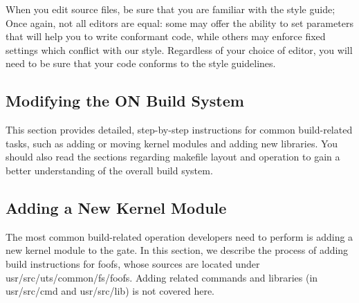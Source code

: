 \documentclass{article}
\begin{document}
When you edit source files, be sure that you are familiar with the style guide;
Once again, not all editors are equal: some may offer the ability to set
parameters that will help you to write conformant code, while others may enforce
fixed settings which conflict with our style. Regardless of your choice of
editor, you will need to be sure that your code conforms to the style
guidelines.

\subsection*{Modifying the ON Build System}

This section provides detailed, step-by-step instructions for common
build-related tasks, such as adding or moving kernel modules and adding new
libraries. You should also read the sections regarding makefile layout and
operation to gain a better understanding of the overall build system.

\subsection*{Adding a New Kernel Module}

The most common build-related operation developers need to perform is adding a
new kernel module to the gate. In this section, we describe the process of
adding build instructions for foofs, whose sources are located under \\
usr/src/uts/common/fs/foofs. Adding related commands and libraries (in \\
usr/src/cmd and usr/src/lib) is not covered here.
\end{document}
